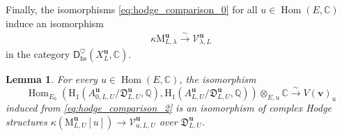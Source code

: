 \documentclass[12pt]{amsart}
\numberwithin{equation}{section}
\theoremstyle{plain}
\newtheorem{lem}[proposition]{Lemma}
\theoremstyle{definition}
\theoremstyle{remark}
\renewcommand{\c}[1]{\mathcal{#1}}
\renewcommand{\d}[1]{\mathbb{#1}}
\newcommand{\f}[1]{\mathfrak{#1}}
\renewcommand{\r}[1]{\mathrm{#1}}
\renewcommand{\sf}[1]{\mathsf{#1}}
\renewcommand{\(}{\left(}
\renewcommand{\)}{\right)}
\newcommand{\cV}{\c V}
\newcommand{\dC}{\d C}
\newcommand{\dQ}{\d Q}
\newcommand{\fD}{\f D}
\newcommand{\rH}{\r H}
\newcommand{\rM}{\r M}
\newcommand{\sfD}{\sf D}
\newcommand{\bbu}{\boldsymbol{u}}
\newcommand{\bbv}{\boldsymbol{v}}
\newcommand{\hs}{\r{hs}}
\DeclareMathOperator{\Hom}{Hom}
\begin{document}
Finally, the isomorphisms \eqref{eq:hodge_comparison_0} for all $u\in\Hom(E,\dC)$ induce an isomorphism
\begin{align}\label{eq:hodge_comparison}
\kappa\rM_{L,\lambda}^{\bbu}\xrightarrow\sim\cV^{\bbu}_{\lambda,L}
\end{align}
in the category $\sfD_{\hs}^\heartsuit(X_L^{\bbu},\dC)$.


\begin{lem}\label{le:hodge_comparison}
For every $u\in\Hom(E,\dC)$, the isomorphism
\[
\Hom_{E_0}\(\rH_1(A_{0,L,U}^{\bbu}/\fD_{L,U}^{\bbu},\dQ),\rH_1(A_{L,U}^{\bbu}/\fD_{L,U}^{\bbu},\dQ)\)\otimes_{E,u}\dC
\xrightarrow\sim V(\bbv)_u
\]
induced from \eqref{eq:hodge_comparison_2} is an isomorphism of complex Hodge structures $\kappa\(\rM_{L,U}^{\bbu}[u]\)\to\cV^{\bbu}_{u,L,U}$ over $\fD^{\bbu}_{L,U}$.
\end{lem}
\end{document}
